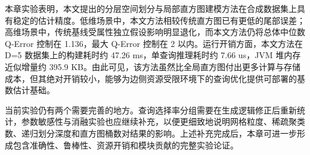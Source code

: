 本章实验表明，本文提出的分层空间划分与局部直方图建模方法在合成数据集上具有稳定的估计精度。低维场景中，本文方法相较传统直方图已有更低的尾部误差；高维场景中，传统基线受属性独立假设影响明显退化，而本文方法仍将总体中位数 Q-Error 控制在 1.136，最大 Q-Error 控制在 2 以内。运行开销方面，本文方法在 D=5 数据集上的构建耗时约 47.26 ms，单查询推理耗时约 7.66 us，JVM 堆内存近似增量约 395.9 KB。由此可见，该方法虽然比全局直方图付出更多计算与存储成本，但其绝对开销较小，能够为边侧资源受限环境下的查询优化提供可部署的基数估计基础。

当前实验仍有两个需要完善的地方。查询选择率分组需要在生成逻辑修正后重新统计，参数敏感性与消融实验也应继续补充，以便更细致地说明网格粒度、稀疏聚类数、递归划分深度和直方图桶数对结果的影响。上述补充完成后，本章可进一步形成包含准确性、鲁棒性、资源开销和模块贡献的完整实验论证。
